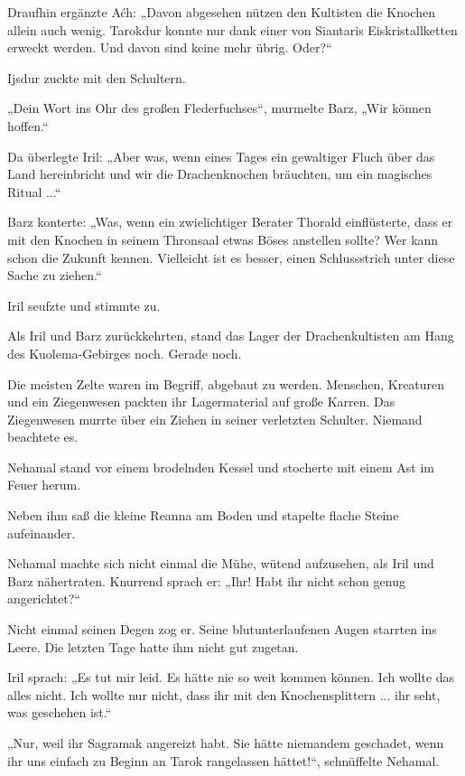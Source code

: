 Draufhin ergänzte Aćh: „Davon abgesehen nützen den Kultisten die Knochen allein auch wenig. Tarokdur konnte nur dank einer von Siantaris Eiskristallketten erweckt werden. Und davon sind keine mehr übrig. Oder?“

Ijsdur zuckte mit den Schultern.

„Dein Wort ins Ohr des großen Flederfuchses“, murmelte Barz, „Wir können hoffen.“

Da überlegte Iril: „Aber was, wenn eines Tages ein gewaltiger Fluch über das Land hereinbricht und wir die Drachenknochen bräuchten, um ein magisches Ritual ...“

Barz konterte: „Was, wenn ein zwielichtiger Berater Thorald einflüsterte, dass er mit den Knochen in seinem Thronsaal etwas Böses anstellen sollte? Wer kann schon die Zukunft kennen. Vielleicht ist es besser, einen Schlussstrich unter diese Sache zu ziehen.“

Iril seufzte und stimmte zu.



\trennzeichen



Als Iril und Barz zurückkehrten, stand das Lager der Drachenkultisten am Hang des Kuolema-Gebirges noch. Gerade noch.

Die meisten Zelte waren im Begriff, abgebaut zu werden. Menschen, Kreaturen und ein Ziegenwesen packten ihr Lagermaterial auf große Karren. Das Ziegenwesen murrte über ein Ziehen in seiner verletzten Schulter. Niemand beachtete es.

Nehamal stand vor einem brodelnden Kessel und stocherte mit einem Ast im Feuer herum.

Neben ihm saß die kleine Reanna am Boden und stapelte flache Steine aufeinander.

Nehamal machte sich nicht einmal die Mühe, wütend aufzusehen, als Iril und Barz nähertraten. Knurrend sprach er: „Ihr! Habt ihr nicht schon genug angerichtet?“

Nicht einmal seinen Degen zog er. Seine blutunterlaufenen Augen starrten ins Leere. Die letzten Tage hatte ihm nicht gut zugetan.

Iril sprach: „Es tut mir leid. Es hätte nie so weit kommen können. Ich wollte das alles nicht. Ich wollte nur nicht, dass ihr mit den Knochensplittern ... ihr seht, was geschehen ist.“

„Nur, weil ihr Sagramak angereizt habt. Sie hätte niemandem geschadet, wenn ihr uns einfach zu Beginn an Tarok rangelassen hättet!“, schnüffelte Nehamal.


